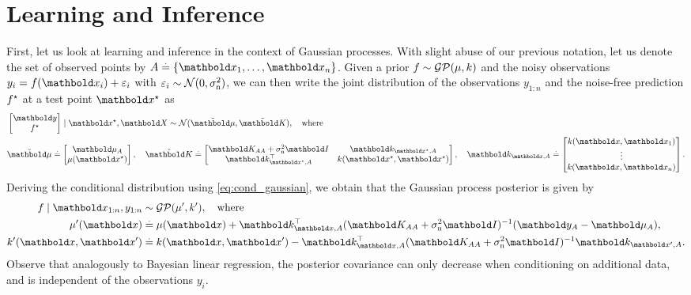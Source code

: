 \section{Learning and Inference}\label{sec:gp:learning_and_inference}

First, let us look at learning and inference in the context of Gaussian processes.
With slight abuse of our previous notation, let us denote the set of observed points by $\sA \defeq \{\vx_1, \dots, \vx_n\}$.
Given a prior $f \sim \GP{\mu}{k}$ and the noisy observations ${y_i = f(\vx_i) + \varepsilon_i}$ with ${\varepsilon_i \sim \N{0}{\sigman^2}}$, we can then write the joint distribution of the observations $y_{1:n}$ and the noise-free prediction $f^\star$ at a test point $\vxs$ as \begin{align}
  &\begin{bmatrix}
    \vy \\
    \fs \\
  \end{bmatrix} \mid \vxs, \mX \sim \N{\Tilde{\vmu}}{\Tilde{\mK}}, \quad\text{where} \\
  &\Tilde{\vmu} \defeq \begin{bmatrix}
    \vmu_\sA \\
    \mu(\vxs) \\
  \end{bmatrix}, \quad \Tilde{\mK} \defeq \begin{bmatrix}
    \mK_{\sA\sA} + \sigman^2 \mI & \vk_{\vxs,\sA} \\
    \transpose{\vk_{\vxs,\sA}} & k(\vxs, \vxs) \\
  \end{bmatrix}, \quad \vk_{\vx,\sA} \defeq \begin{bmatrix}
    k(\vx,\vx_1) \\ \vdots \\ k(\vx, \vx_n)
  \end{bmatrix}.
\end{align}
Deriving the conditional distribution using \eqref{eq:cond_gaussian}, we obtain that the Gaussian process posterior is given by \begin{align}
  f \mid \vx_{1:n}, y_{1:n} &\sim \GP{\mu'}{k'}, \quad\text{where} \label{eq:gp_posterior} \\
  \mu'(\vx) &\defeq \mu(\vx) + \transpose{\vk_{\vx,\sA}} \inv{(\mK_{\sA\sA} + \sigman^2 \mI)} (\vy_\sA - \vmu_\sA), \\
  k'(\vx, \vxp) &\defeq k(\vx, \vxp) - \transpose{\vk_{\vx,\sA}} \inv{(\mK_{\sA\sA} + \sigman^2 \mI)} \vk_{\vxp,\sA}.
\end{align}
Observe that analogously to Bayesian linear regression, the posterior covariance can only decrease when conditioning on additional data, and is independent of the observations $y_i$.


